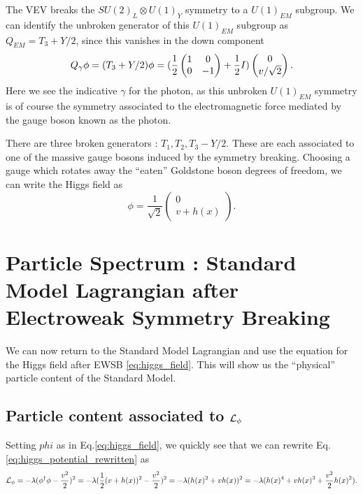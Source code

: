 The VEV breaks the $SU(2)_L \otimes U(1)_Y$ symmetry to a $U(1)_{EM}$ subgroup.
We can identify the unbroken generator of this $U(1)_{EM}$ subgroup as $Q_{EM} = T_3 + Y/2$, since this vanishes in the down component
\begin{equation}
Q_{\gamma} \phi = (T_3 + Y/2) \phi = (\frac{1}{2} \begin{pmatrix} 1 & 0 \\ 0 & -1 \end{pmatrix} + \frac{1}{2} I ) \begin{pmatrix} 0 \\ v/\sqrt{2} \end{pmatrix}.
\end{equation}
Here we see the indicative $\gamma$ for the photon, as this unbroken $U(1)_{EM}$ symmetry is of course the symmetry associated to the electromagnetic force mediated by the gauge boson known as the photon.

There are three broken generators : $T_1, T_2, T_3 - Y/2$.
These are each associated to one of the massive gauge bosons induced by the symmetry breaking.
Choosing a gauge which rotates away the ``eaten'' Goldstone boson degrees of freedom, we can write the Higgs field as
\begin{equation}
\label{eq:higgs_field}
\phi = \frac{1}{\sqrt{2}}\begin{pmatrix} 0 \\ v + h(x) \end{pmatrix}.
\end{equation}

\section{Particle Spectrum : Standard Model Lagrangian after Electroweak Symmetry Breaking}

We can now return to the Standard Model Lagrangian and use the equation for the Higgs field after EWSB \ref{eq:higgs_field}.
This will show us the ``physical'' particle content of the Standard Model.

\subsection{Particle content associated to $\mathcal{L}_\phi$}

Setting $phi$ as in Eq.\ref{eq:higgs_field}, we quickly see that we can rewrite Eq.\ref{eq:higgs_potential_rewritten} as
\begin{equation}
\mathcal{L}_\phi = - \lambda (\phi^\dagger \phi - \frac{v^2}{2})^2  = - \lambda ( \frac{1}{2} (v + h(x))^2 - \frac{v^2}{2})^2 = - \lambda ( h(x)^2 + vh(x))^2 = -\lambda ( h(x)^4 + v h(x)^3 + \frac{v^2}{2} h(x)^2 ).
\end{equation}

